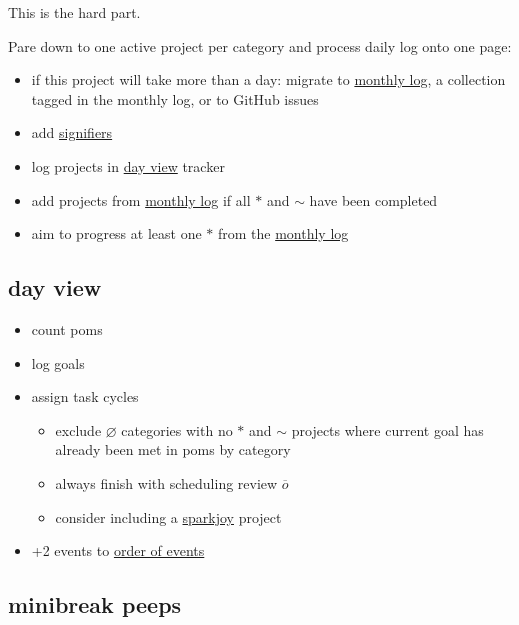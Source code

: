 \documentclass[]{book}
\providecommand{\tightlist}{%
  \setlength{\itemsep}{0pt}\setlength{\parskip}{0pt}}
\begin{document}
This is the hard part.

Pare down to one active project per category and process daily log onto one page:

\begin{itemize}
\tightlist
\item
  if this project will take more than a day: migrate to \protect\hyperlink{monthly-log}{monthly log}, a collection tagged in the monthly log, or to GitHub issues
\item
  add \protect\hyperlink{signifiers}{signifiers}
\item
  log projects in \protect\hyperlink{day-view}{day view} tracker
\item
  add projects from \protect\hyperlink{monthly-log}{monthly log} if all \(*\) and \(\sim\) have been completed
\item
  aim to progress at least one \(*\) from the \protect\hyperlink{monthly-log}{monthly log}
\end{itemize}

\hypertarget{day-view-1}{%
\subsection{day view}\label{day-view-1}}

\begin{itemize}
\tightlist
\item
  count poms
\item
  log goals
\item
  assign task cycles

  \begin{itemize}
  \tightlist
  \item
    exclude \(\varnothing\) categories with no \(*\) and \(\sim\) projects where current goal has already been met in poms by category
  \item
    always finish with scheduling review \(\overline o\)
  \item
    consider including a \href{https://en.wikipedia.org/wiki/Marie_Kondo}{sparkjoy} project
  \end{itemize}
\item
  +2 events to \protect\hyperlink{order-of-events}{order of events}
\end{itemize}

\hypertarget{minibreak-peeps}{%
\subsection{minibreak peeps}\label{minibreak-peeps}}
\end{document}
